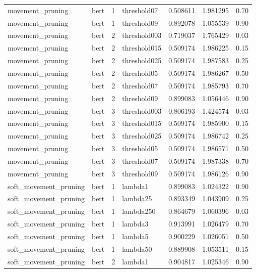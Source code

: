 \begin{tabular}{llllrrr}
     movement\_pruning &  bert &   1 &  threshold07 &  0.508611 & 1.981295 &    0.70 \\
     movement\_pruning &  bert &   1 &  threshold09 &  0.892078 & 1.055539 &    0.90 \\
     movement\_pruning &  bert &   2 & threshold003 &  0.719037 & 1.765429 &    0.03 \\
     movement\_pruning &  bert &   2 & threshold015 &  0.509174 & 1.986225 &    0.15 \\
     movement\_pruning &  bert &   2 & threshold025 &  0.509174 & 1.987583 &    0.25 \\
     movement\_pruning &  bert &   2 &  threshold05 &  0.509174 & 1.986267 &    0.50 \\
     movement\_pruning &  bert &   2 &  threshold07 &  0.509174 & 1.985793 &    0.70 \\
     movement\_pruning &  bert &   2 &  threshold09 &  0.899083 & 1.056446 &    0.90 \\
     movement\_pruning &  bert &   3 & threshold003 &  0.806193 & 1.424574 &    0.03 \\
     movement\_pruning &  bert &   3 & threshold015 &  0.509174 & 1.985900 &    0.15 \\
     movement\_pruning &  bert &   3 & threshold025 &  0.509174 & 1.986742 &    0.25 \\
     movement\_pruning &  bert &   3 &  threshold05 &  0.509174 & 1.986571 &    0.50 \\
     movement\_pruning &  bert &   3 &  threshold07 &  0.509174 & 1.987338 &    0.70 \\
     movement\_pruning &  bert &   3 &  threshold09 &  0.509174 & 1.986126 &    0.90 \\
soft\_movement\_pruning &  bert &   1 &      lambda1 &  0.899083 & 1.024322 &    0.90 \\
soft\_movement\_pruning &  bert &   1 &     lambda25 &  0.893349 & 1.043909 &    0.25 \\
soft\_movement\_pruning &  bert &   1 &    lambda250 &  0.864679 & 1.060396 &    0.03 \\
soft\_movement\_pruning &  bert &   1 &      lambda3 &  0.913991 & 1.026479 &    0.70 \\
soft\_movement\_pruning &  bert &   1 &      lambda5 &  0.900229 & 1.026051 &    0.50 \\
soft\_movement\_pruning &  bert &   1 &     lambda50 &  0.889908 & 1.053511 &    0.15 \\
soft\_movement\_pruning &  bert &   2 &      lambda1 &  0.904817 & 1.025346 &    0.90 \\

\end{tabular}
